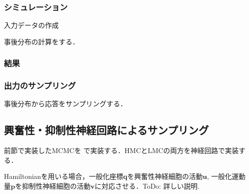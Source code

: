 \subsubsection{シミュレーション}

入力データの作成



事後分布の計算をする．

\subsubsection{結果}




\subsubsection{出力のサンプリング}

事後分布から応答をサンプリングする．




\subsection{興奮性・抑制性神経回路によるサンプリング}
前節で実装したMCMCを\textbf{} で実装する．HMCとLMCの両方を神経回路で実装する．

Hamiltonianを用いる場合，一般化座標$\mathbf{q}$を興奮性神経細胞の活動$\mathbf{u}$, 一般化運動量$\mathbf{p}$を抑制性神経細胞の活動$\mathbf{v}$に対応させる．ToDo: 詳しい説明.

